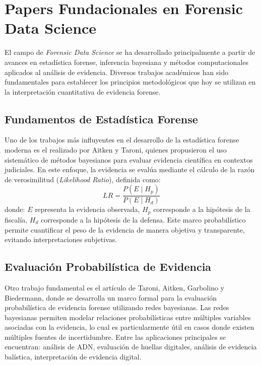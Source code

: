 \documentclass[a4paper,10pt,oneside]{article}
\begin{document}
\section{Papers Fundacionales en Forensic Data Science}

El campo de \textit{Forensic Data Science} se ha desarrollado principalmente a partir de avances en estad\'istica forense, inferencia bayesiana y m\'etodos computacionales aplicados al an\'alisis de evidencia. Diversos trabajos acad\'emicos han sido fundamentales para establecer los principios metodol\'ogicos que hoy se utilizan en la interpretaci\'on cuantitativa de evidencia forense.

\subsection{Fundamentos de Estad\'istica Forense}

Uno de los trabajos m\'as influyentes en el desarrollo de la estad\'istica forense moderna es el realizado por Aitken y Taroni, quienes propusieron el uso sistem\'atico de m\'etodos bayesianos para evaluar evidencia cient\'ifica en contextos judiciales. En este enfoque, la evidencia se eval\'ua mediante el c\'alculo de la raz\'on de verosimilitud (\textit{Likelihood Ratio}), definida como:
\begin{equation}
LR = \frac{P(E \mid H_p)}{P(E \mid H_d)}
\end{equation}
donde: $E$ representa la evidencia observada, $H_p$ corresponde a la hip\'otesis de la fiscal\'ia, $H_d$ corresponde a la hip\'otesis de la defensa. Este marco probabil\'istico permite cuantificar el peso de la evidencia de manera objetiva y transparente, evitando interpretaciones subjetivas.

\subsection{Evaluaci\'on Probabil\'istica de Evidencia}

Otro trabajo fundamental es el art\'iculo de Taroni, Aitken, Garbolino y Biedermann, donde se desarrolla un marco formal para la evaluaci\'on probabil\'istica de evidencia forense utilizando redes bayesianas. Las redes bayesianas permiten modelar relaciones probabil\'isticas entre m\'ultiples variables asociadas con la evidencia, lo cual es particularmente \'util en casos donde existen m\'ultiples fuentes de incertidumbre. Entre las aplicaciones principales se encuentran: an\'alisis de ADN,  evaluaci\'on de huellas digitales, an\'alisis de evidencia bal\'istica, interpretaci\'on de evidencia digital.
\end{document}
